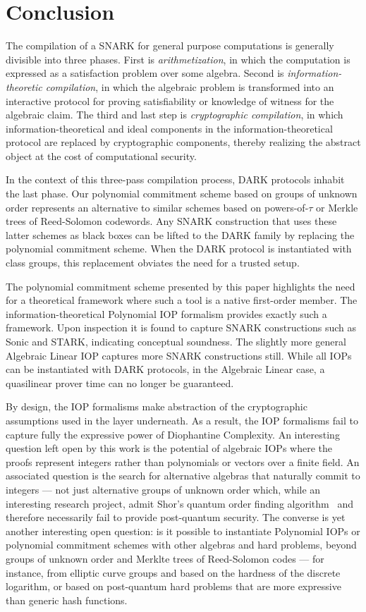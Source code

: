\documentclass{article}
\theoremstyle{definition}
\begin{document}
\section{Conclusion}

The compilation of a SNARK for general purpose computations is generally divisible into three phases. First is \emph{arithmetization}, in which the computation is expressed as a satisfaction problem over some algebra. Second is \emph{information-theoretic compilation}, in which the algebraic problem is transformed into an interactive protocol for proving satisfiability or knowledge of witness for the algebraic claim. The third and last step is \emph{cryptographic compilation}, in which information-theoretical and ideal components in the information-theoretical protocol are replaced by cryptographic components, thereby realizing the abstract object at the cost of computational security. 

In the context of this three-pass compilation process, DARK protocols inhabit the last phase. Our polynomial commitment scheme based on groups of unknown order represents an alternative to similar schemes based on powers-of-$\tau$ or Merkle trees of Reed-Solomon codewords. Any SNARK construction that uses these latter schemes as black boxes can be lifted to the DARK family by replacing the polynomial commitment scheme. When the DARK protocol is instantiated with class groups, this replacement obviates the need for a trusted setup.

The polynomial commitment scheme presented by this paper highlights the need for a theoretical framework where such a tool is a native first-order member.  The information-theoretical Polynomial IOP formalism provides exactly such a framework. Upon inspection it is found to capture SNARK constructions such as Sonic and STARK, indicating conceptual soundness. The slightly more general Algebraic Linear IOP captures more SNARK constructions still. While all IOPs can be instantiated with DARK protocols, in the Algebraic Linear case, a quasilinear prover time can no longer be guaranteed. 

By design, the IOP formalisms make abstraction of the cryptographic assumptions used in the layer underneath. As a result, the IOP formalisms fail to capture fully the expressive power of Diophantine Complexity. An interesting question left open by this work is the potential of algebraic IOPs where the proofs represent integers rather than polynomials or vectors over a finite field. An associated question is the search for alternative algebras that naturally commit to integers --- not just alternative groups of unknown order which, while an interesting research project, admit Shor's quantum order finding algorithm~\cite{conf/focs/Shor94} and therefore necessarily fail to provide post-quantum security. The converse is yet another interesting open question: is it possible to instantiate Polynomial IOPs or polynomial commitment schemes with other algebras and hard problems, beyond groups of unknown order and Merklte trees of Reed-Solomon codes --- for instance, from elliptic curve groups and based on the hardness of the discrete logarithm, or based on post-quantum hard problems that are more expressive than generic hash functions.
\end{document}
